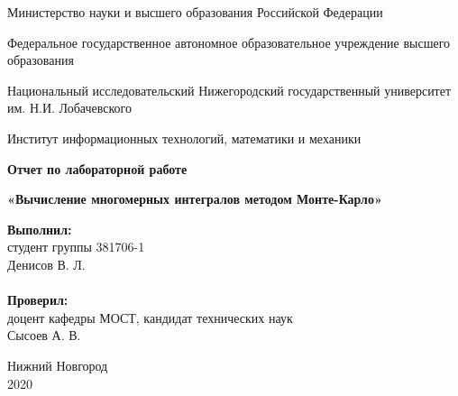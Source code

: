 \documentclass{report}
\newenvironment{changemargin}[2]{%
\begin{list}{}{%
\setlength{\topsep}{0pt}%
\setlength{\leftmargin}{#1}%
\setlength{\rightmargin}{#2}%
}%
\item[]}{\end{list}}
\begin{document}
\begin{titlepage}
\begin{changemargin}{-1cm}{-1cm}
\begin{center}
Министерство науки и высшего образования Российской Федерации	\\
\end{center}
\begin{center}
Федеральное государственное автономное образовательное учреждение высшего образования \\
\end{center}
\begin{center}
Национальный исследовательский Нижегородский государственный университет им. Н.И. Лобачевского	\\
\end{center}

\begin{center}
Институт информационных технологий, математики и механики \\
\end{center}

\vspace{4em}

\begin{center}
\textbf{Отчет по лабораторной работе} \\
\end{center}
\begin{center}
\textbf{«Вычисление многомерных интегралов методом Монте-Карло»} \\
\end{center}

\vspace{4em}

\newbox{\lbox}
\newlength{\maxl}
\setlength{\maxl}{\wd\lbox}
\hfill\parbox{7cm}{
\hspace*{5cm}\hspace*{-5cm}\textbf{Выполнил:} \\ студент группы 381706-1 \\ Денисов В. Л.\\
\\
\hspace*{5cm}\hspace*{-5cm}\textbf{Проверил:}\\ доцент кафедры МОСТ, кандидат технических наук \\ Сысоев А. В.
}

\vspace{\fill}

\begin{center} Нижний Новгород \\ 2020 \end{center}

\end{changemargin}
\end{titlepage}
\end{document}

